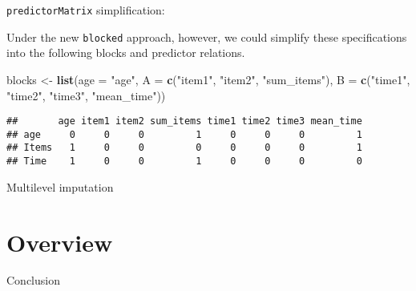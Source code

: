 \documentclass[ignorenonframetext,]{beamer}
\newenvironment{Shaded}{\begin{snugshade}}{\end{snugshade}}
\newcommand{\DataTypeTok}[1]{\textcolor[rgb]{0.13,0.29,0.53}{#1}}
\newcommand{\KeywordTok}[1]{\textcolor[rgb]{0.13,0.29,0.53}{\textbf{#1}}}
\newcommand{\NormalTok}[1]{#1}
\newcommand{\StringTok}[1]{\textcolor[rgb]{0.31,0.60,0.02}{#1}}
\begin{document}
\begin{frame}[fragile]{\texttt{predictorMatrix} simplification:}
\protect\hypertarget{predictormatrix-simplification-1}{}

Under the new \texttt{blocked} approach, however, we could simplify
these specifications into the following blocks and predictor relations.

\begin{Shaded}
\begin{Highlighting}[]
\NormalTok{blocks <-}\StringTok{ }\KeywordTok{list}\NormalTok{(}\DataTypeTok{age =} \StringTok{"age"}\NormalTok{, }
               \DataTypeTok{A =} \KeywordTok{c}\NormalTok{(}\StringTok{"item1"}\NormalTok{, }\StringTok{"item2"}\NormalTok{, }\StringTok{"sum_items"}\NormalTok{), }
               \DataTypeTok{B =} \KeywordTok{c}\NormalTok{(}\StringTok{"time1"}\NormalTok{, }\StringTok{"time2"}\NormalTok{, }\StringTok{"time3"}\NormalTok{, }\StringTok{"mean_time"}\NormalTok{))}
\end{Highlighting}
\end{Shaded}

\begin{verbatim}
##       age item1 item2 sum_items time1 time2 time3 mean_time
## age     0     0     0         1     0     0     0         1
## Items   1     0     0         0     0     0     0         1
## Time    1     0     0         1     0     0     0         0
\end{verbatim}

\end{frame}

\begin{frame}{Multilevel imputation}
\protect\hypertarget{multilevel-imputation}{}

\end{frame}

\hypertarget{overview}{%
\section{Overview}\label{overview}}

\begin{frame}{Conclusion}
\protect\hypertarget{conclusion}{}

\end{frame}
\end{document}
